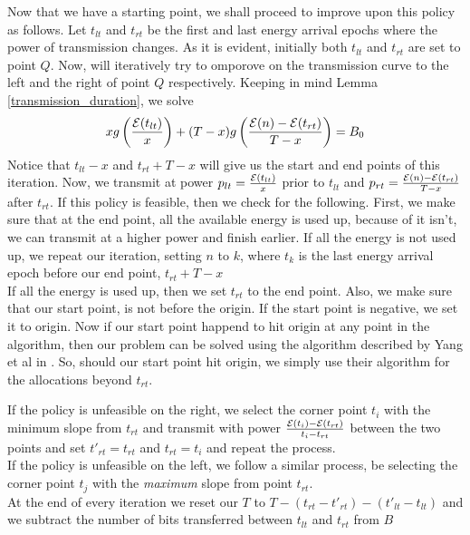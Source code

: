 Now that we have a starting point, we shall proceed to improve upon this policy as follows. Let $t_{lt}$ and $t_{rt}$ be the first and last energy arrival epochs where the power of transmission changes. 
As it is evident, initially both $t_{lt}$ and $t_{rt}$ are set to point $Q$. Now, will iteratively try to omporove on the transmission curve to the left and the right of point $Q$ respectively. 
Keeping in mind Lemma \ref{transmission_duration}, we solve 
\begin{equation}
\label{xandy}
xg\left(\frac{\ETx(t_{lt})}{x}\right) + (T-x)g\left(\frac{\ETx(n)-\ETx(t_{rt})}{T-x}\right) = B_0
\end{equation}
Notice that $t_{lt} - x$ and $t_{rt} + T-x$ will give us the start and end points of this iteration. Now, we transmit at power $p_{lt} = \frac{\mathcal{E}(t_{lt})}{x}$ prior to $t_{lt}$ and $p_{rt} = \frac{\mathcal{E}(n) - \mathcal{E}(t_{rt})}{T-x}$ after $t_{rt}$. 
If this policy is feasible, then we check for the following. First, we make sure that at the end point, all the available energy is used up, because of it isn't, we can transmit at a higher power and finish earlier. 
If all the energy is not used up, we repeat our iteration, setting $n$ to $k$, where $t_k$ is the last energy arrival epoch before our end point, $t_{rt} + T-x$  \\
If all the energy is used up, then we set $t_{rt}$ to the end point. 
Also, we make sure that our start point, is not before the origin. If the start point is negative, we set it to origin. Now if our start point happend to hit origin at any point in the algorithm, then our problem can be 
solved using the algorithm described by Yang et al in \cite{Yang}. So, should our start point hit origin, we simply use their algorithm for the allocations beyond $t_{rt}$.

If the policy is unfeasible on the right, we select the corner point $t_i$ with the minimum slope from $t_{rt}$ and transmit with power $\frac{\mathcal{E}(t_i) - \mathcal{E}(t_{rt})}{t_i-t_{rt}}$ between the two points and set $t'_{rt} = t_{rt}$ and $t_{rt} = t_i$ and repeat the process.\\
If the policy is unfeasible on the left, we follow a similar process, be selecting the corner point $t_j$ with the \textit{maximum} slope from point $t_{rt}$.\\
At the end of every iteration we reset our $T$ to $ T - (t_{rt} - t'_{rt}) - (t'_{lt} - t_{lt})$ and we subtract the number of bits transferred between $t_{lt}$ and $t_{rt}$ from $B$

